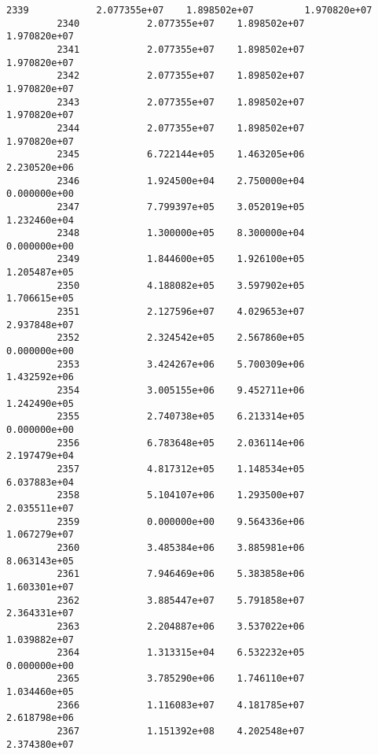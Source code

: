 \documentclass[11pt]{article}
\begin{document}
\begin{Verbatim}[commandchars=\\\{\}]
         2339            2.077355e+07    1.898502e+07         1.970820e+07   
         2340            2.077355e+07    1.898502e+07         1.970820e+07   
         2341            2.077355e+07    1.898502e+07         1.970820e+07   
         2342            2.077355e+07    1.898502e+07         1.970820e+07   
         2343            2.077355e+07    1.898502e+07         1.970820e+07   
         2344            2.077355e+07    1.898502e+07         1.970820e+07   
         2345            6.722144e+05    1.463205e+06         2.230520e+06   
         2346            1.924500e+04    2.750000e+04         0.000000e+00   
         2347            7.799397e+05    3.052019e+05         1.232460e+04   
         2348            1.300000e+05    8.300000e+04         0.000000e+00   
         2349            1.844600e+05    1.926100e+05         1.205487e+05   
         2350            4.188082e+05    3.597902e+05         1.706615e+05   
         2351            2.127596e+07    4.029653e+07         2.937848e+07   
         2352            2.324542e+05    2.567860e+05         0.000000e+00   
         2353            3.424267e+06    5.700309e+06         1.432592e+06   
         2354            3.005155e+06    9.452711e+06         1.242490e+05   
         2355            2.740738e+05    6.213314e+05         0.000000e+00   
         2356            6.783648e+05    2.036114e+06         2.197479e+04   
         2357            4.817312e+05    1.148534e+05         6.037883e+04   
         2358            5.104107e+06    1.293500e+07         2.035511e+07   
         2359            0.000000e+00    9.564336e+06         1.067279e+07   
         2360            3.485384e+06    3.885981e+06         8.063143e+05   
         2361            7.946469e+06    5.383858e+06         1.603301e+07   
         2362            3.885447e+07    5.791858e+07         2.364331e+07   
         2363            2.204887e+06    3.537022e+06         1.039882e+07   
         2364            1.313315e+04    6.532232e+05         0.000000e+00   
         2365            3.785290e+06    1.746110e+07         1.034460e+05   
         2366            1.116083e+07    4.181785e+07         2.618798e+06   
         2367            1.151392e+08    4.202548e+07         2.374380e+07   
         

\end{Verbatim}
\end{document}
